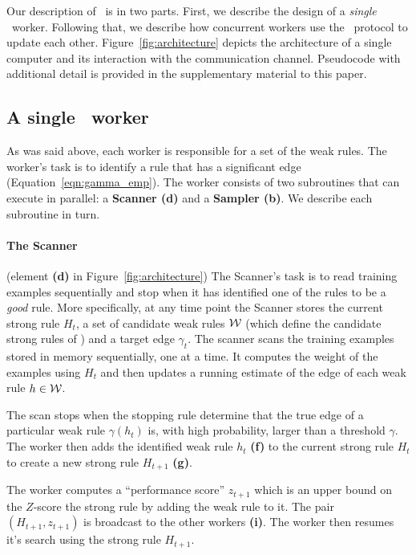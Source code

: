 Our description of \Sparrow\ is in two parts. First, we describe the
design of a {\em single} \Sparrow\ worker. Following that, we describe
how concurrent workers use the \tmsn\ protocol to update each
other. Figure~\ref{fig:architecture} depicts the architecture of a
single computer and its interaction with the communication
channel. Pseudocode with additional detail is provided in the
supplementary material to this paper.

\subsection{A single \Sparrow\ worker}
\label{sec:single_worker}
As was said above, each worker is responsible for a set of the weak
rules.  The worker's task is to identify a rule that has a significant
edge (Equation~\ref{eqn:gamma_emp}). The worker consists of two
subroutines that can execute in parallel: a {\bf Scanner (d)} and a
{\bf Sampler (b)}. We describe each subroutine in turn.
\paragraph*{The Scanner}(element {\bf (d)} in
Figure~\ref{fig:architecture})
The Scanner's task is to read training examples sequentially and stop
when it has identified one of the rules to be a {\em good} rule. More
specifically, at any time point the Scanner stores the current strong
rule $H_t$, a set of candidate weak rules ${\cal W}$ (which
define the candidate strong rules of \tmsn) and a target
edge $\gamma_t$. The scanner scans the training examples stored in
memory sequentially, one at a time. It computes the weight of the
examples using $H_t$ and then updates a running estimate of the edge
of each weak rule $h \in {\cal W}$.

The scan stops when the stopping rule determine that
the true edge of a particular weak rule
$\gamma(h_t)$ is, with high probability,
larger than a threshold $\gamma$. The
worker then adds the identified weak rule $h_t$ {\bf (f)} to the current
strong rule $H_t$ to create a new strong rule $H_{t+1}$ {\bf (g)}.

The worker computes a ``performance score'' $z_{t+1}$ which is an
upper bound on the $Z$-score the strong rule by adding the weak rule
to it. The pair $(H_{t+1},z_{t+1})$ is broadcast to the other workers
{\bf (i)}. The worker then resumes it's search using the strong rule
$H_{t+1}$.
